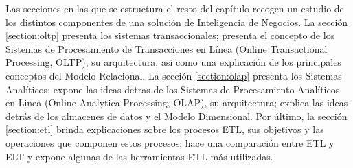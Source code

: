 Las secciones en las que se estructura el resto del cap\'itulo recogen un estudio de los distintos componentes de una 
soluci\'on de Inteligencia de Negocios. La secci\'on \ref{section:oltp} presenta los sistemas 
transaccionales; presenta el concepto de los Sistemas de Procesamiento de Transacciones en L\'inea (Online Transactional Processing, OLTP), 
su arquitectura, as\'i como una explicaci\'on de los principales 
conceptos del Modelo Relacional. La secci\'on \ref{section:olap} presenta los Sistemas Anal\'iticos; 
expone las ideas detras de los Sistemas de Procesamiento Anal\'iticos en Linea (Online Analytica Processing, OLAP), su arquitectura; 
explica las ideas detr\'as de los almacenes de datos y el 
Modelo Dimensional. Por \'ultimo, la 
secci\'on \ref{section:etl} brinda explicaciones sobre los procesos ETL, sus objetivos y las operaciones que componen 
estos procesos; hace una comparaci\'on entre ETL y ELT y expone algunas de las herramientas ETL m\'as utilizadas.







